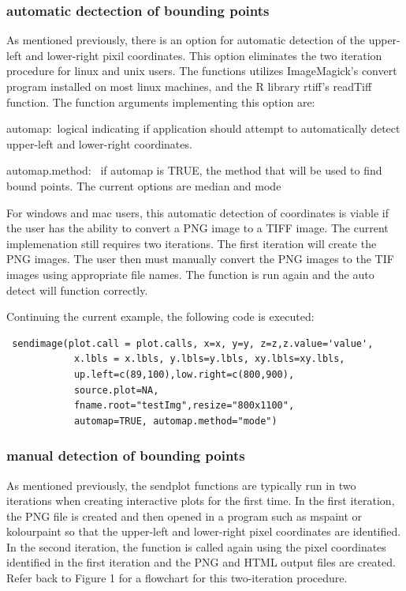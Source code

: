 \documentclass[]{article}
\begin{document}
\subsubsection{automatic dectection of bounding points}

\indent As mentioned previously, there is an option for automatic detection of the upper-left and lower-right pixil coordinates. This option eliminates the two iteration procedure for linux and unix users. The functions utilizes ImageMagick's convert program installed on most linux machines, and the R library rtiff's readTiff function. The function arguments implementing this option are:
\begin{description}
 \item{automap:~}{logical indicating if application should
    attempt to automatically detect upper-left and lower-right 
    coordinates.}

  \item{automap.method:~ }{if automap is TRUE, the method that will be
    used to find bound points. The current options are median and mode}

 \end{description}

\indent For windows and mac users, this automatic detection of coordinates is viable if the user has the ability to convert a PNG image to a TIFF image. The current implemenation still requires two iterations. The first iteration will create the PNG images. The user then must manually convert the PNG images to the TIF images using appropriate file names. The function is run again and the auto detect will function correctly.  

\indent Continuing the current example, the following code is executed:
\begin{verbatim}
 sendimage(plot.call = plot.calls, x=x, y=y, z=z,z.value='value',
            x.lbls = x.lbls, y.lbls=y.lbls, xy.lbls=xy.lbls,
            up.left=c(89,100),low.right=c(800,900),
            source.plot=NA,
            fname.root="testImg",resize="800x1100",
            automap=TRUE, automap.method="mode")
\end{verbatim}


\subsubsection{manual detection of bounding points}

\indent As mentioned previously, the sendplot functions are typically run in two iterations when creating interactive plots for the first time. In the first iteration, the PNG file is created and then opened in a program such as mspaint or kolourpaint so that the upper-left and lower-right pixel coordinates are identified. In the second iteration, the function is called again using the pixel coordinates identified in the first iteration and the PNG and HTML output files are created.  Refer back to Figure 1 for a flowchart for this two-iteration procedure. 
\end{document}
